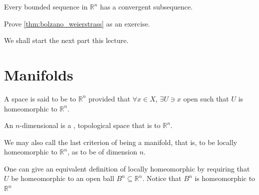 \documentclass[notoc,notitlepage]{tufte-book}
\begin{document}
\begin{thm}\label{thm:bolzano_weierstrass}
  Every bounded sequence in $\mathbb{R}^n$ has a convergent subsequence.
\end{thm}

\begin{ex}
  Prove \cref{thm:bolzano_weierstrass} as an exercise.
\end{ex}


We shall start the next part this lecture.

\section{Manifolds}%
\label{sec:manifolds}

\begin{defn}\label{defn:locally_homeomorphic}
  A space is said to be  to $\mathbb{R}^n$ provided that
  $\forall x \in X$, $\exists U \ni x$ open such that $U$ is homeomorphic to $\mathbb{R}^n$.
\end{defn}

\begin{defn}[Manifold]\label{defn:manifold}
  An $n$-dimensional  is a ,  topological space that is 
   to $\mathbb{R}^n$.
\end{defn}

\begin{note}
  We may also call the last criterion of being a manifold, that is, to be locally
  homeomorphic to $\mathbb{R}^n$, as to be  of dimension
  $n$.
\end{note}

\begin{note}
  One can give an equivalent definition of locally homeomorphic by requiring that
  $U$ be homeomorphic to an open ball $B^n \subseteq \mathbb{R}^n$. Notice that
  $B^n$ is homeomorphic to $\mathbb{R}^n$ 
\end{note}
\end{document}
